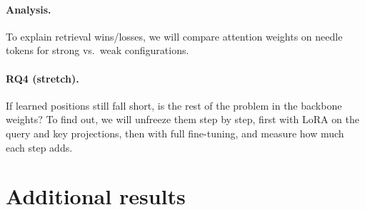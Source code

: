 \documentclass[11pt]{article}
\begin{document}
\paragraph{Analysis.}
To explain retrieval wins/losses, we will compare attention weights on
needle tokens for strong vs.\ weak configurations.

\paragraph{RQ4 (stretch).}
If learned positions still fall short, is the rest of the problem in the backbone weights?
To find out, we will unfreeze them step by step, first with LoRA \citep{hu2022lora} on the
query and key projections, then with full fine-tuning, and measure how much each step adds.

\clearpage


\clearpage
\appendix
\section{Additional results}

\end{document}
